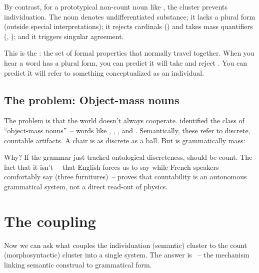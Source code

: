 By contrast, for a prototypical non-count noun like , the cluster prevents individuation. The noun denotes undifferentiated substance; it lacks a plural form (outside special interpretations); it rejects cardinals (\ungram{}) and takes mass quantifiers (, ); and it triggers singular agreement.

This is the : the set of formal properties that normally travel together. When you hear a word has a plural form, you can predict it will take  and reject . You can predict it will refer to something conceptualized as an individual.

\subsection{The problem: Object-mass nouns}
\label{sec:9:object-mass}

The problem is that the world doesn't always cooperate. \textcite{rothstein2010} identified the class of \enquote{object-mass nouns}~-- words like , , , and . Semantically, these refer to discrete, countable artifacts. A chair is as discrete as a ball. But  is grammatically mass:
\ea
    \z
\z

Why? If the grammar just tracked ontological discreteness,  should be count. The fact that it isn't~-- that English forces us to say  while French speakers comfortably say  (three furnitures)~-- proves that countability is an autonomous grammatical system, not a direct read-out of physics.

\section{The coupling}
\label{sec:9:coupling}

Now we can ask what couples the individuation (semantic) cluster to the count (morphosyntactic) cluster into a single system. The answer is ~-- the mechanism linking semantic construal to grammatical form.

